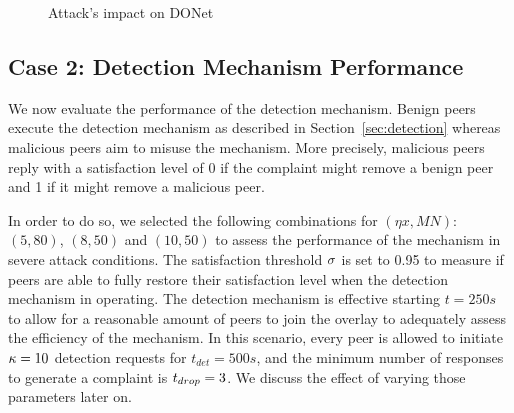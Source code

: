 \begin{figure}[t!]
\centering

  \mbox{}
   \vspace{-1.5mm}
  \mbox{}

  \caption{Attack's impact on DONet}
  \vspace{-3.5mm}
  \label{fig:attack-results}
  \end{figure}


\subsection{Case 2: Detection Mechanism Performance}

We now evaluate the performance of the detection mechanism.
Benign peers execute the detection mechanism as described in Section~\ref{sec:detection} whereas malicious peers aim to misuse the mechanism.
More precisely, malicious peers reply with a satisfaction level of 0 if the complaint might remove a benign peer and 1 if it might remove a malicious peer. 

In order to do so, we selected the following combinations for $(\eta x, MN)$: $(5, 80)$, $(8, 50)$ and $(10, 50)$ to assess the performance of the mechanism in severe attack conditions.
The satisfaction threshold $\sigma$ is set to 0.95 to measure if peers are able to fully restore their satisfaction level when the detection mechanism in operating.
The detection mechanism is effective starting $t=250s$ to allow for a reasonable amount of peers to join the overlay to adequately assess the efficiency of the mechanism.
In this scenario, every peer is allowed to initiate $\kappa=10$ detection requests for $t_{det}=500s$, and the minimum number of responses to generate a complaint is $t_{drop}=3$. 
We discuss the effect of varying those parameters later on.

